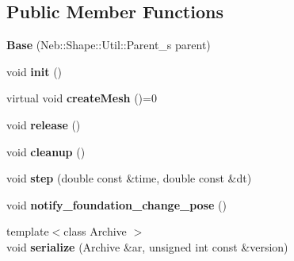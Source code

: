 \subsection*{\-Public \-Member \-Functions}
\begin{DoxyCompactItemize}
\item 
\hypertarget{classNeb_1_1Shape_1_1Base_a35afa951586265017239c2ad304a554e}{{\bfseries \-Base} (\-Neb\-::\-Shape\-::\-Util\-::\-Parent\-\_\-s parent)}\label{classNeb_1_1Shape_1_1Base_a35afa951586265017239c2ad304a554e}

\item 
\hypertarget{classNeb_1_1Shape_1_1Base_a11dd7e8eefb27d06da70638da87f0900}{void {\bfseries init} ()}\label{classNeb_1_1Shape_1_1Base_a11dd7e8eefb27d06da70638da87f0900}

\item 
\hypertarget{classNeb_1_1Shape_1_1Base_a1e46c36d898482587e96521c38bff294}{virtual void {\bfseries create\-Mesh} ()=0}\label{classNeb_1_1Shape_1_1Base_a1e46c36d898482587e96521c38bff294}

\item 
\hypertarget{classNeb_1_1Shape_1_1Base_aaa87e380e910b2bebedd62e2c04f7666}{void {\bfseries release} ()}\label{classNeb_1_1Shape_1_1Base_aaa87e380e910b2bebedd62e2c04f7666}

\item 
\hypertarget{classNeb_1_1Shape_1_1Base_afa4dd91b2963eaac1a01b59ffe4f629a}{void {\bfseries cleanup} ()}\label{classNeb_1_1Shape_1_1Base_afa4dd91b2963eaac1a01b59ffe4f629a}

\item 
\hypertarget{classNeb_1_1Shape_1_1Base_aa120c13cb2f8d462c97d6d97740df38c}{void {\bfseries step} (double const \&time, double const \&dt)}\label{classNeb_1_1Shape_1_1Base_aa120c13cb2f8d462c97d6d97740df38c}

\item 
\hypertarget{classNeb_1_1Shape_1_1Base_a30d28dc76de95cae8d78731c7ff86af8}{void {\bfseries notify\-\_\-foundation\-\_\-change\-\_\-pose} ()}\label{classNeb_1_1Shape_1_1Base_a30d28dc76de95cae8d78731c7ff86af8}

\item 
\hypertarget{classNeb_1_1Shape_1_1Base_ac7fc4a307cbc844fa931322ec26cc20e}{{\footnotesize template$<$class Archive $>$ }\\void {\bfseries serialize} (\-Archive \&ar, unsigned int const \&version)}\label{classNeb_1_1Shape_1_1Base_ac7fc4a307cbc844fa931322ec26cc20e}

\end{DoxyCompactItemize}
